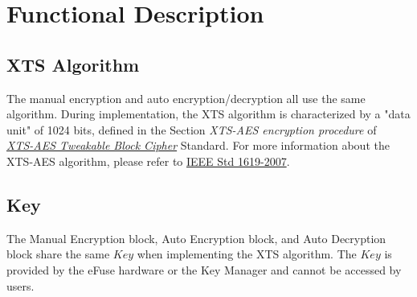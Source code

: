 \documentclass[main\_\_EN.tex]{subfiles}
\begin{document}
\section{Functional Description}

\subsection{XTS Algorithm}
\label{sec:extmemncr-xts-algo}

The manual encryption and auto encryption/decryption all use the same algorithm. During implementation, the XTS algorithm is characterized by a "data unit" of 1024 bits, defined in the Section \textit{XTS-AES encryption procedure} of \\ \href{https://ieeexplore.ieee.org/document/4493450}{\textit{XTS-AES Tweakable Block Cipher}} Standard. For more information about the XTS-AES algorithm, please refer to \href{https://ieeexplore.ieee.org/document/4493450}{IEEE Std 1619-2007}.

\subsection{Key}
\label{sec:extmemncr-key}

The Manual Encryption block, Auto Encryption block, and Auto Decryption block share the same \begin{math}\mathit{Key}\end{math} when implementing the XTS algorithm. The \begin{math}\mathit{Key}\end{math} is provided by the eFuse hardware or the Key Manager and cannot be accessed by users.
\end{document}
